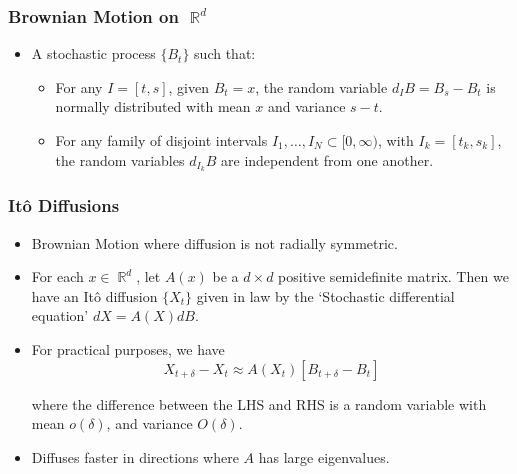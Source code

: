 \documentclass[usenames,dvipsnames,12pt]{beamer}
\DeclareMathOperator{\RR}{\mathbb{R}}
\begin{document}
\begin{frame}
    \frametitle{Brownian Motion on $\RR^d$}

    \begin{itemize}
        \item A stochastic process $\{ B_t \}$ such that:

        \begin{itemize}
            \item For any $I = [t,s]$, given $B_t = x$, the random variable $d_I B = B_s - B_t$ is normally distributed with mean $x$ and variance $s - t$.

            \item For any family of disjoint intervals $I_1,\dots,I_N \subset [0,\infty)$, with $I_k = [t_k,s_k]$, the random variables $d_{I_k} B$ are independent from one another.
        \end{itemize}
    \end{itemize}

\end{frame}

\begin{frame}
    \frametitle{It\^{o} Diffusions}

    \begin{itemize}
        \item Brownian Motion where diffusion is not radially symmetric.

        \item For each $x \in \RR^d$, let $A(x)$ be a $d \times d$ positive semidefinite matrix. Then we have an It\^{o} diffusion $\{ X_t \}$ given in law by the `Stochastic differential equation' $dX = A(X) dB$.

        \item For practical purposes, we have
        \[ X_{t + \delta} - X_t \approx A(X_t) [B_{t + \delta} - B_t] \]

        where the difference between the LHS and RHS is a random variable with mean $o(\delta)$, and variance $O(\delta)$. %

        \item Diffuses faster in directions where $A$ has large eigenvalues.
    \end{itemize}

\end{frame}
\end{document}
